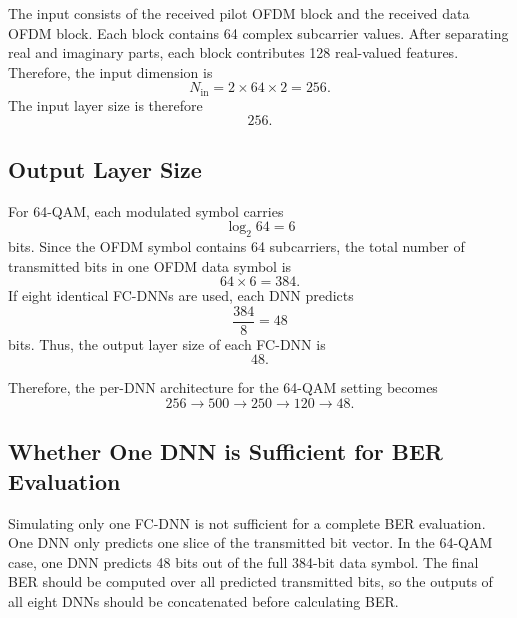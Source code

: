 \documentclass[11pt,a4paper]{article}
\begin{document}
The input consists of the received pilot OFDM block and the received data OFDM block. Each block contains 64 complex subcarrier values. After separating real and imaginary parts, each block contributes 128 real-valued features. Therefore, the input dimension is
\begin{equation}
    N_{\mathrm{in}}
    = 2 \times 64 \times 2
    = 256 .
\end{equation}
The input layer size is therefore
\begin{equation}
    \boxed{256}.
\end{equation}

\subsection{Output Layer Size}

For 64-QAM, each modulated symbol carries
\begin{equation}
    \log_2 64 = 6
\end{equation}
bits. Since the OFDM symbol contains 64 subcarriers, the total number of transmitted bits in one OFDM data symbol is
\begin{equation}
    64 \times 6 = 384 .
\end{equation}
If eight identical FC-DNNs are used, each DNN predicts
\begin{equation}
    \frac{384}{8} = 48
\end{equation}
bits. Thus, the output layer size of each FC-DNN is
\begin{equation}
    \boxed{48}.
\end{equation}

Therefore, the per-DNN architecture for the 64-QAM setting becomes
\begin{equation}
    \boxed{
    256 \rightarrow 500 \rightarrow 250 \rightarrow 120 \rightarrow 48
    } .
\end{equation}

\subsection{Whether One DNN is Sufficient for BER Evaluation}

Simulating only one FC-DNN is not sufficient for a complete BER evaluation. One DNN only predicts one slice of the transmitted bit vector. In the 64-QAM case, one DNN predicts 48 bits out of the full 384-bit data symbol. The final BER should be computed over all predicted transmitted bits, so the outputs of all eight DNNs should be concatenated before calculating BER.
\end{document}
